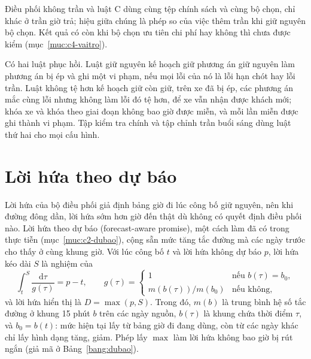 Điều phối không trần và luật C dùng cùng tệp chính sách và cùng bộ chọn, chỉ khác ở trần giờ trả; hiệu
giữa chúng là phép so của việc thêm trần khi giữ nguyên bộ chọn. Kết quả có còn khi bộ chọn ưu tiên chi
phí hay không thì chưa được kiểm (mục~\ref{muc:c4-vaitro}).

Có hai luật phục hồi. Luật giữ nguyên kế hoạch giữ phương án giữ nguyên làm phương án bị ép và ghi một
vi phạm, nếu mọi lỗi của nó là lỗi hạn chót hay lỗi trần. Luật không tệ hơn kế hoạch giữ còn giữ, trên xe
đã bị ép, các phương án mắc cùng lỗi nhưng không làm lỗi đó tệ hơn, để xe vẫn nhận được khách mới; khóa
xe và khóa theo giai đoạn không bao giờ được miễn, và mỗi lần miễn được ghi thành vi phạm. Tập kiểm tra
chính và tập chỉnh trần buổi sáng dùng luật thứ hai cho mọi cấu hình.

\section{Lời hứa theo dự báo}
\label{muc:dubao}

Lời hứa của bộ điều phối giả định bảng giờ đi lúc công bố giữ nguyên, nên khi đường đông dần, lời hứa
sớm hơn giờ đến thật dù không có quyết định điều phối nào. Lời hứa theo dự báo (forecast-aware promise),
một cách làm đã có trong thực tiễn (mục~\ref{muc:c2-dubao}), cộng sẵn mức tăng tắc đường mà các ngày
trước cho thấy ở cùng khung giờ. Với lúc công bố $t$ và lời hứa không dự báo $p$, lời hứa kéo dài $S$ là
nghiệm của
\begin{equation}
\int_{t}^{S} \frac{\mathrm{d}\tau}{g(\tau)} = p - t, \qquad
g(\tau) =
\begin{cases}
1 & \text{nếu } b(\tau) = b_0,\\
m(b(\tau))/m(b_0) & \text{nếu không,}
\end{cases}
\label{eq:keodan}
\end{equation}
và lời hứa hiển thị là $D = \max(p, S)$. Trong đó, $m(b)$ là trung bình hệ số tắc đường ở khung 15 phút
$b$ trên các ngày nguồn, $b(\tau)$ là khung chứa thời điểm $\tau$, và $b_0 = b(t)$: mức hiện tại lấy từ
bảng giờ đi đang dùng, còn từ các ngày khác chỉ lấy hình dạng tăng, giảm. Phép lấy $\max$ làm lời hứa
không bao giờ bị rút ngắn (giả mã ở Bảng~\ref{bang:dubao}).

